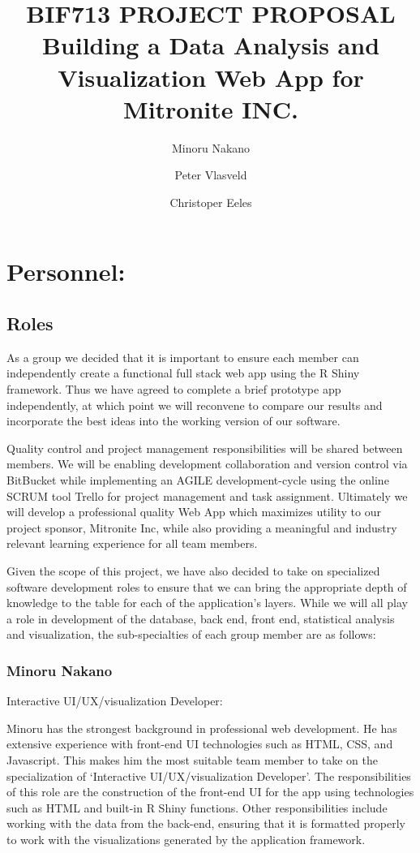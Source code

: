 \documentclass[10pt,twocolumn,letterpaper]{article}
\title{
		\usefont{OT1}{bch}{b}{n}
		\normalfont \normalsize \textsc{BIF713 PROJECT PROPOSAL} \\ [14pt]
		\huge Building a Data Analysis and Visualization Web App for Mitronite INC. \\
}
\author{Minoru Nakano}
\author{Peter Vlasveld}
\author{Christoper Eeles}
\begin{document}
\maketitle


\section{Personnel:}

            \subsection{Roles}

            As a group we decided that it is important to ensure each member can independently create a functional full stack web app using the R Shiny framework.
	    Thus we have agreed to complete a brief prototype app independently, at which point we will reconvene to compare our results and incorporate the best
	    ideas into the working version of our software.
		
	Quality control and project management responsibilities will be shared between members. 
	We will be enabling development collaboration and version control via BitBucket while implementing an 
	AGILE development-cycle using the online SCRUM tool Trello for project management and task assignment.
        Ultimately we will develop a professional quality Web App which maximizes utility to our project sponsor, 
	Mitronite Inc, while also providing a meaningful and industry relevant learning experience for all team members.

            Given the scope of this project, we have also decided to take on specialized software development roles to ensure that we can bring the appropriate depth
	    of knowledge to the table for each of the application's layers.
	    While we will all play a role in development of the database, back end, front end, statistical analysis and visualization, the sub-specialties of each group
	    member are as follows:

                \subsubsection*{Minoru Nakano}

                Interactive UI/UX/visualization Developer:

		Minoru has the strongest background in professional web development.
		He has extensive experience with front-end UI technologies such as HTML, CSS, and Javascript.
		This makes him the most suitable team member to take on the specialization of `Interactive UI/UX/visualization Developer'.
		The responsibilities of this role are the construction of the front-end UI for the app using technologies such as HTML and built-in R Shiny functions.
		Other responsibilities include working with the data from the back-end, ensuring that it is formatted properly to work with the visualizations generated 
		by the application framework.
\end{document}

